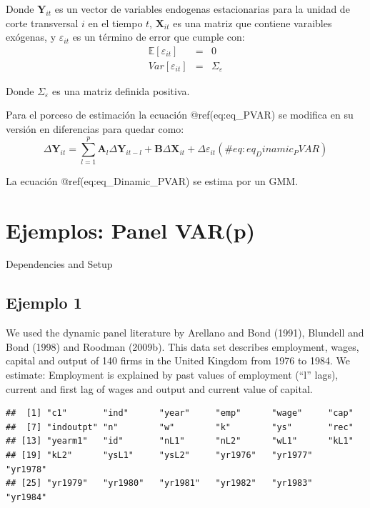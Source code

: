 \documentclass[
]{book}
\begin{document}
Donde \(\mathbf{Y}_{it}\) es un vector de variables endogenas estacionarias para la unidad de corte transversal \(i\) en el tiempo \(t\), \(\mathbf{X}_{it}\) es una matriz que contiene varaibles exógenas, y \(\varepsilon_{it}\) es un término de error que cumple con:
\begin{eqnarray*}
    \mathbb{E}[\varepsilon_{it}] & = & 0 \\
    Var[\varepsilon_{it}] & = & \Sigma_\varepsilon
\end{eqnarray*}

Donde \(\Sigma_\varepsilon\) es una matriz definida positiva.

Para el porceso de estimación la ecuación @ref(eq:eq\_PVAR) se modifica en su versión en diferencias para quedar como:
\begin{equation}
    \Delta \mathbf{Y}_{it} = \sum_{l = 1}^p \mathbf{A}_l \Delta \mathbf{Y}_{i t - l} + \mathbf{B} \Delta \mathbf{X}_{it} + \Delta \varepsilon_{it}
    (\#eq:eq_Dinamic_PVAR)
\end{equation}

La ecuación @ref(eq:eq\_Dinamic\_PVAR) se estima por un GMM.

\hypertarget{ejemplos-panel-varp}{%
\section{Ejemplos: Panel VAR(p)}\label{ejemplos-panel-varp}}

Dependencies and Setup

\hypertarget{ejemplo-1}{%
\subsection{Ejemplo 1}\label{ejemplo-1}}

We used the dynamic panel literature by Arellano and Bond (1991), Blundell and Bond (1998) and Roodman (2009b).
This data set describes employment, wages, capital and output of 140 firms in the United Kingdom from 1976 to 1984.
We estimate: Employment is explained by past values of employment (``l'' lags), current and first lag of wages and output and current value of capital.

\begin{verbatim}
##  [1] "c1"       "ind"      "year"     "emp"      "wage"     "cap"     
##  [7] "indoutpt" "n"        "w"        "k"        "ys"       "rec"     
## [13] "yearm1"   "id"       "nL1"      "nL2"      "wL1"      "kL1"     
## [19] "kL2"      "ysL1"     "ysL2"     "yr1976"   "yr1977"   "yr1978"  
## [25] "yr1979"   "yr1980"   "yr1981"   "yr1982"   "yr1983"   "yr1984"
\end{verbatim}
\end{document}
